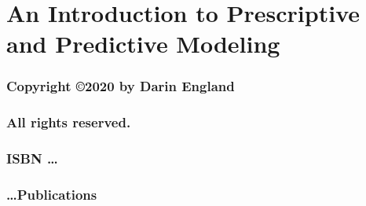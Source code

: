 \documentclass[12pt]{book}
\begin{document}
\frontmatter
%
\chapter*{\Huge \center An Introduction to Prescriptive and Predictive Modeling }
\thispagestyle{empty}
\newpage
\subsection*{\center \normalsize Copyright \copyright 2020 by Darin England}
\subsection*{\center \normalsize All rights reserved.}
\subsection*{\center \normalsize ISBN \dots}
\subsection*{\center \normalsize \dots Publications}
%
%
\tableofcontents

\mainmatter







\backmatter

\nocite{Anderson:2015pnas} %

\printbibliography
\end{document}
